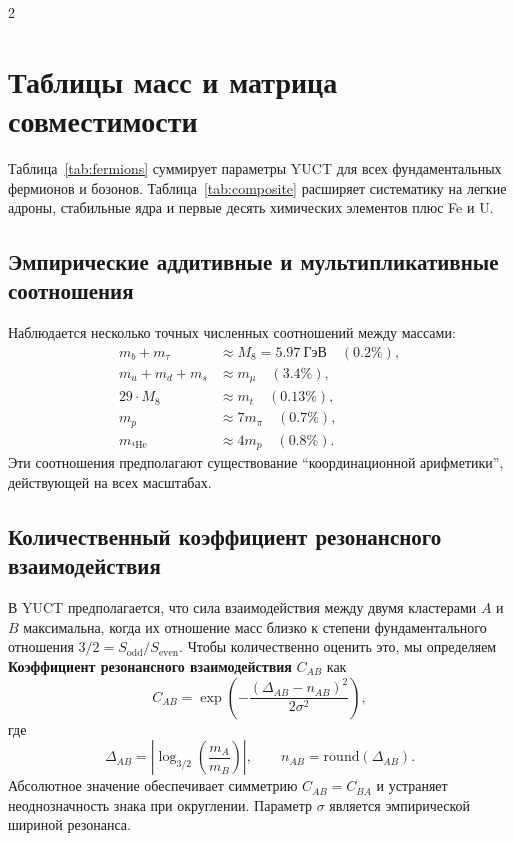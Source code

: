 \documentclass[11pt,a4paper]{article}
\begin{document}
	\begin{multicols}{2}
		
		\section{Таблицы масс и матрица совместимости}
		\label{sec:tables}
		
		Таблица~\ref{tab:fermions} суммирует параметры YUCT для всех фундаментальных фермионов и бозонов. Таблица~\ref{tab:composite} расширяет систематику на легкие адроны, стабильные ядра и первые десять химических элементов плюс Fe и U.
		
		\subsection{Эмпирические аддитивные и мультипликативные соотношения}
		
		Наблюдается несколько точных численных соотношений между массами:
		\begin{align*}
			m_b + m_\tau &\approx M_8 = 5.97\ \text{ГэВ} \quad (0.2\%),\\
			m_u + m_d + m_s &\approx m_\mu \quad (3.4\%),\\
			29 \cdot M_8 &\approx m_t \quad (0.13\%),\\
			m_p &\approx 7 m_\pi \quad (0.7\%),\\
			m_{^4\mathrm{He}} &\approx 4 m_p \quad (0.8\%).
		\end{align*}
		Эти соотношения предполагают существование ``координационной арифметики'', действующей на всех масштабах.
		
		\subsection{Количественный коэффициент резонансного взаимодействия}
		
		В YUCT предполагается, что сила взаимодействия между двумя кластерами \(A\) и \(B\) максимальна, когда их отношение масс близко к степени фундаментального отношения \(3/2 = S_{\mathrm{odd}}/S_{\mathrm{even}}\). Чтобы количественно оценить это, мы определяем \textbf{Коэффициент резонансного взаимодействия} \(C_{AB}\) как
		\begin{equation}
			C_{AB} = \exp\left( - \frac{(\Delta_{AB} - n_{AB})^2}{2\sigma^2} \right),
			\label{eq:CAB}
		\end{equation}
		где
		\[
		\Delta_{AB} = \left| \log_{3/2}\left( \frac{m_A}{m_B} \right) \right|, \qquad n_{AB} = \text{round}(\Delta_{AB}).
		\]
		Абсолютное значение обеспечивает симметрию \(C_{AB}=C_{BA}\) и устраняет неоднозначность знака при округлении. Параметр \(\sigma\) является эмпирической шириной резонанса.
		

\end{multicols}
\end{document}
